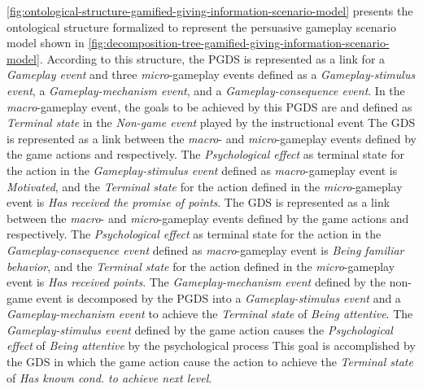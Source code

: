 \autoref{fig:ontological-structure-gamified-giving-information-scenario-model} presents the ontological structure formalized to represent the persuasive gameplay scenario model shown in \autoref{fig:decomposition-tree-gamified-giving-information-scenario-model}. 
According to this structure, the PGDS  is represented as a link for a \emph{Gameplay event} and three \emph{micro}-gameplay events defined as a \emph{Gameplay-stimulus event}, a \emph{Gameplay-mechanism event}, and a \emph{Gameplay-consequence event}.
In the \emph{macro}-gameplay event, the goals to be achieved by this PGDS are  and  defined as \emph{Terminal state} in the \emph{Non-game event} played by the instructional event 
The GDS  is represented as a link between the \emph{macro}- and \emph{micro}-gameplay events defined by the game actions  and  respectively.
The \emph{Psychological effect} as terminal state for the action  in the \emph{Gameplay-stimulus event} defined as \emph{macro}-gameplay event is \emph{Motivated}, and the \emph{Terminal state} for the action  defined in the \emph{micro}-gameplay event is \emph{Has received the promise of points}. 
The GDS  is represented as a link between the \emph{macro}- and \emph{micro}-gameplay events defined by the game actions  and  respectively.
The \emph{Psychological effect} as terminal state for the action  in the \emph{Gameplay-consequence event} defined as \emph{macro}-gameplay event is \emph{Being familiar behavior}, and the \emph{Terminal state} for the action  defined in the \emph{micro}-gameplay event is \emph{Has received points}. 
The \emph{Gameplay-mechanism event} defined by the non-game event  is decomposed by the PGDS  into a \emph{Gameplay-stimulus event} and a \emph{Gameplay-mechanism event} to achieve the \emph{Terminal state} of \emph{Being attentive}. 
The \emph{Gameplay-stimulus event} defined by the game action  causes the \emph{Psychological effect} of \emph{Being attentive} by the psychological process 
This goal is accomplished by the GDS  in which the game action  cause the action  to achieve the \emph{Terminal state} of \emph{Has known cond. to achieve next level}.

